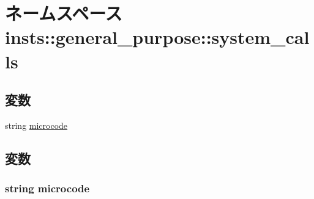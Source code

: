 \hypertarget{namespaceinsts_1_1general__purpose_1_1system__calls}{
\section{ネームスペース insts::general\_\-purpose::system\_\-calls}
\label{namespaceinsts_1_1general__purpose_1_1system__calls}
}
\subsection*{変数}
\begin{DoxyCompactItemize}
\item 
string \hyperlink{namespaceinsts_1_1general__purpose_1_1system__calls_a770f11a173e99389a8802f0107ed8f52}{microcode}
\end{DoxyCompactItemize}


\subsection{変数}
\hypertarget{namespaceinsts_1_1general__purpose_1_1system__calls_a770f11a173e99389a8802f0107ed8f52}{
\subsubsection[{microcode}]{\setlength{\rightskip}{0pt plus 5cm}string {\bf microcode}}}
\label{namespaceinsts_1_1general__purpose_1_1system__calls_a770f11a173e99389a8802f0107ed8f52}
